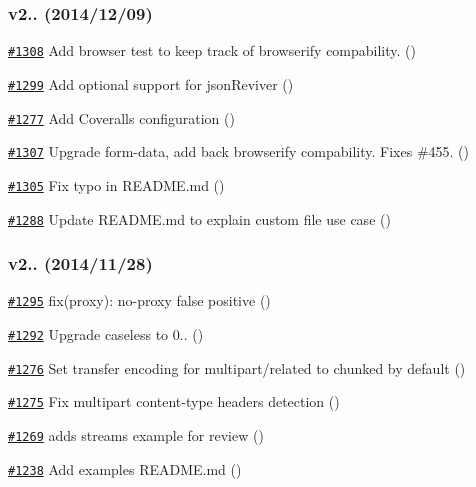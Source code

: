 \subsubsection*{v2.. (2014/12/09)}


\begin{DoxyItemize}
\item \href{https://github.com/request/request/pull/1308}{\tt \#1308} Add browser test to keep track of browserify compability. ()
\item \href{https://github.com/request/request/pull/1299}{\tt \#1299} Add optional support for json\+Reviver ()
\item \href{https://github.com/request/request/pull/1277}{\tt \#1277} Add Coveralls configuration ()
\item \href{https://github.com/request/request/pull/1307}{\tt \#1307} Upgrade form-\/data, add back browserify compability. Fixes \#455. ()
\item \href{https://github.com/request/request/pull/1305}{\tt \#1305} Fix typo in R\+E\+A\+D\+M\+E.\+md ()
\item \href{https://github.com/request/request/pull/1288}{\tt \#1288} Update R\+E\+A\+D\+M\+E.\+md to explain custom file use case ()
\end{DoxyItemize}

\subsubsection*{v2.. (2014/11/28)}


\begin{DoxyItemize}
\item \href{https://github.com/request/request/pull/1295}{\tt \#1295} fix(proxy)\+: no-\/proxy false positive ()
\item \href{https://github.com/request/request/pull/1292}{\tt \#1292} Upgrade {\ttfamily caseless} to 0.. ()
\item \href{https://github.com/request/request/pull/1276}{\tt \#1276} Set transfer encoding for multipart/related to chunked by default ()
\item \href{https://github.com/request/request/pull/1275}{\tt \#1275} Fix multipart content-\/type headers detection ()
\item \href{https://github.com/request/request/pull/1269}{\tt \#1269} adds streams example for review ()
\item \href{https://github.com/request/request/pull/1238}{\tt \#1238} Add examples R\+E\+A\+D\+M\+E.\+md ()
\end{DoxyItemize}

